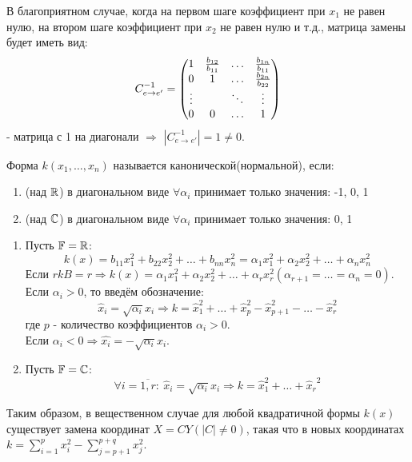 \begin{remark}
    В благоприятном случае, когда на первом шаге коэффициент при $x_1$ не равен нулю, на втором шаге коэффициент при $x_2$ не равен нулю и т.д., матрица замены будет иметь вид:
    $$C_{e\rightarrow e'}^{-1}=\begin{pmatrix}
    1 & \frac{b_{12}}{b_{11}} & \ldots & \frac{b_{1n}}{b_{11}}\\
    0 & 1 & \ldots & \frac{b_{2n}}{b_{22}}\\
    \vdots & \null & \ddots & \vdots\\
    0 & 0 & \ldots & 1
    \end{pmatrix}$$ 
    - матрица с 1 на диагонали $\Longrightarrow$ $|C_{e\rightarrow e'}^{-1}|=1\neq0$.
\end{remark}
\begin{definition}
    Форма $k(x_1,\ldots,x_n)$ называется канонической(нормальной), если:
    \begin{enumerate}
        \item (над $\mathbb{R}$) в диагональном виде $\forall \alpha_i$ принимает только значения: -1, 0, 1
        \item (над $\mathbb{C}$) в диагональном виде $\forall \alpha_i$ принимает только значения: 0, 1
    \end{enumerate}
\end{definition}
\begin{example}\tab
    \begin{enumerate}
        \item Пусть $\mathbb{F}=\mathbb{R}$:
        $$k(x)=b_{11}x_1^2+b_{22}x_2^2+\ldots+b_{nn}x_n^2 = \alpha_1x_1^2+\alpha_2x_2^2+\ldots+\alpha_nx_n^2$$
        Если $rkB=r \Longrightarrow  k(x)=\alpha_1x_1^2+\alpha_2x_2^2+\ldots+\alpha_rx_r^2(\alpha_{r+1}=\ldots=\alpha_n=0)$.\\
        Если $\alpha_i>0$, то введём обозначение: 
        $$\widehat{x}_i=\sqrt{\alpha_i}x_i \Longrightarrow k=\widehat{x}_1^2+\ldots+\widehat{x}_p^2-\widehat{x}_{p+1}^2-\ldots-\widehat{x}_r^2$$
        где $p$ - количество коэффициентов $\alpha_i>0$.\\
        Если $\alpha_i < 0 \Longrightarrow  \widehat{x_i} = -\sqrt{\alpha_i}x_i$.
        \item Пусть $\mathbb{F}=\mathbb{C}$: 
        $$\forall i=\overline{1,r}: \ \widehat{x}_i=\sqrt{\alpha_i}x_i \Longrightarrow k=\widehat{x}_1^2+\ldots+{\widehat{x}_r}^2$$
    \end{enumerate}
\end{example}
Таким образом, в вещественном случае для любой квадратичной формы $k(x)$ существует замена координат $X = CY (|C| \neq 0)$, такая что в новых координатах $k = \sum \limits_{i=1}^p x_i^2 - \sum \limits_{j=p+1}^{p+q} x_j^2$.
